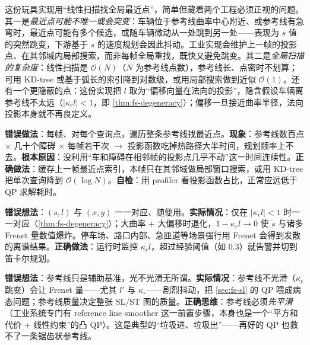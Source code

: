 这份玩具实现用“线性扫描找全局最近点”，简单但藏着两个工程必须正视的问题。其一是\emph{最近点可能不唯一或会突变}：车辆位于参考线曲率中心附近、或参考线有急弯时，最近点可能有多个候选，或随车辆微动从一处跳到另一处——表现为 $s$ 值的突然跳变，下游基于 $s$ 的速度规划会因此抖动。工业实现会维护上一帧的投影点、在其邻域内局部搜索，而非每帧全局重找，既快又避免跳变。其二是\emph{全局扫描的复杂度}：线性扫描是 $\mathcal{O}(N)$（$N$ 为参考线点数），参考线长、点密时不划算；可用 KD-tree 或基于弧长的索引降到对数级，或用局部搜索做到近似 $\mathcal{O}(1)$。还有一个更隐蔽的点：这份实现把 $l$ 取为“偏移向量在法向的投影”，隐含假设车辆离参考线不太远（$|\kappa_r l|<1$，即 \cref{thm:fs-degeneracy}）；偏移一旦接近曲率半径，法向投影本身就不再良定义。

\begin{pitfall}
\textbf{错误做法}：每帧、对每个查询点，遍历整条参考线找最近点。\textbf{现象}：参考线数百点 $\times$ 几十个障碍 $\times$ 每帧若干次 $\to$ 投影函数吃掉热路径大半时间，规划频率上不去。\textbf{根本原因}：没利用“车和障碍在相邻帧的投影点几乎不动”这一时间连续性。\textbf{正确做法}：缓存上一帧最近点索引，本帧只在其邻域做局部窗口搜索，或用 KD-tree 把单次查询降到 $\mathcal{O}(\log N)$。\textbf{自检}：用 profiler 看投影函数占比，正常应远低于 QP 求解耗时。
\end{pitfall}

\begin{pitfall}
\textbf{错误想法}：$(s,l)$ 与 $(x,y)$ 一一对应、随便用。\textbf{实际情况}：仅在 $|\kappa_r l|<1$ 时一一对应（\cref{thm:fs-degeneracy}）；大曲率 + 大偏移时退化，$1-\kappa_r l\to0$ 使 $\dot s$ 与诸多 Frenet 量数值爆炸。停车场、路口内部、急匝道等场景强行用 Frenet 会得到发散的离谱结果。\textbf{正确做法}：运行时监控 $\kappa_r l$，超过经验阈值（如 $0.3$）就告警并切到笛卡尔规划。
\end{pitfall}

\begin{pitfall}
\textbf{错误想法}：参考线只是辅助基准，光不光滑无所谓。\textbf{实际情况}：参考线不光滑（$\kappa_r$ 跳变）会让 Frenet 量——尤其 $l'$ 与 $\kappa_r$——剧烈抖动，把 \cref{sec:fs-sl} 的 QP 喂成病态问题；参考线质量决定整张 SL/ST 图的质量。\textbf{正确思维}：参考线必须\emph{先平滑}（工业系统专门有 reference line smoother 这一前置步骤，本身也是一个“平方和代价 + 线性约束”的凸 QP）。这是典型的“垃圾进、垃圾出”——再好的 QP 也救不了一条锯齿状参考线。
\end{pitfall}


